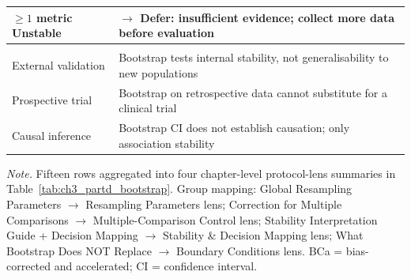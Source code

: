 {\begin{xltabular}{\textwidth}{@{} >{\raggedright\arraybackslash}p{3.0cm} L @{}}
$\geq 1$ metric Unstable & $\to$ \textbf{Defer}: insufficient evidence; collect more data before evaluation \\
\midrule
{} \\
\addlinespace
External validation & Bootstrap tests internal stability, not generalisability to new populations \\
Prospective trial & Bootstrap on retrospective data cannot substitute for a clinical trial \\
Causal inference & Bootstrap CI does not establish causation; only association stability \\
\end{xltabular}}
\vspace{0.4em}
\noindent\textit{Note.} Fifteen rows aggregated into four chapter-level protocol-lens summaries in Table~\ref{tab:ch3_partd_bootstrap}. Group mapping: Global Resampling Parameters $\to$ Resampling Parameters lens; Correction for Multiple Comparisons $\to$ Multiple-Comparison Control lens; Stability Interpretation Guide + Decision Mapping $\to$ Stability \& Decision Mapping lens; What Bootstrap Does NOT Replace $\to$ Boundary Conditions lens. BCa = bias-corrected and accelerated; CI = confidence interval.
